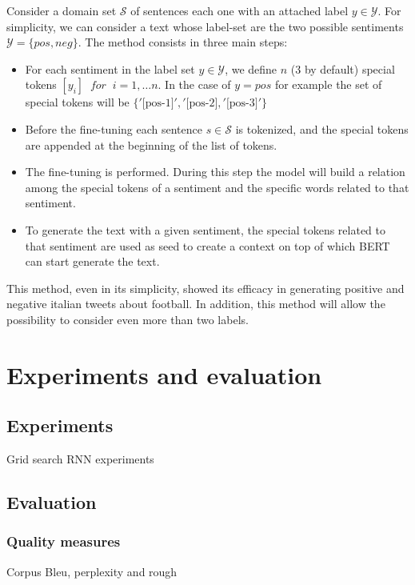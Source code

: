 \documentclass[10pt,twocolumn,letterpaper]{article}
\begin{document}
Consider a domain set $\mathcal S$ of sentences each one with an attached label $y\in \mathcal Y$.
For simplicity, we can consider a text whose label-set are the two possible sentiments $\mathcal Y =\{pos, neg\}$.
The method consists in three main steps:

\begin{itemize}
\item For each sentiment in the label set $y\in\mathcal Y$, we define $n$ (3 by default) special tokens $[y_i]\;\; for\;\;i=1,\ldots n$.
In the case of $y=pos$ for example the set of special tokens will be $\{'\text{[pos-1]}', '\text{[pos-2]}, '\text{[pos-3]}'\}$
\item Before the fine-tuning each sentence $s\in\mathcal S$ is tokenized, and the special tokens are appended at the beginning of the list of tokens.
\item The fine-tuning is performed. During this step the model will build a relation among the special tokens of a sentiment and the specific words
related to that sentiment.
\item To generate the text with a given sentiment, the special tokens related to that sentiment are used as seed to create a context on top of which BERT can start generate the text.

\end{itemize}

This method, even in its simplicity, showed its efficacy in generating positive and negative italian tweets about football.
In addition, this method will allow the possibility to consider even more than two labels.

\section{Experiments and evaluation}

\subsection{Experiments}
Grid search
RNN experiments
\subsection{Evaluation}

\subsubsection{Quality measures}
Corpus Bleu, perplexity and rough
\end{document}

